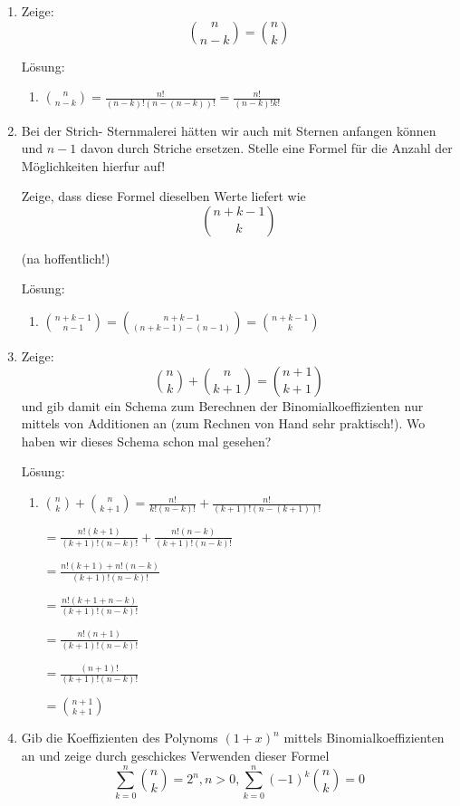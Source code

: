 \documentclass[main.tex]{subfiles}
\begin{document}
\begin{enumerate}
	\item Zeige:
	      \[ \binom{n}{n - k} = \binom{n}{k} \]

	      Lösung:
	      \begin{enumerate}
		      \item \( \binom{n}{n-k}
		            = \frac{n!}{(n-k)! (n - (n -k))!}
		            = \frac{n!}{(n - k)! k!} \)
	      \end{enumerate}
	\item Bei der Strich- Sternmalerei hätten wir auch mit Sternen anfangen können
	      und \( n - 1 \) davon durch Striche ersetzen. Stelle eine Formel für die Anzahl der Möglichkeiten hierfur auf!

	      Zeige, dass diese Formel dieselben Werte liefert wie
	      \[ \binom{ n + k - 1}{ k} \]

	      (na hoffentlich!)

	      Lösung:
	      \begin{enumerate}
		      \item \( \binom{n + k -1}{n-1}
		            = \binom{n + k -1}{(n + k - 1)- (n-1)}
		            = \binom{n + k -1}{k}\)
	      \end{enumerate}
	\item Zeige:
	      \[ \binom{n}{k} + \binom{n}{ k + 1} = \binom{n + 1}{k + 1} \]
	      und gib damit ein Schema zum Berechnen der Binomialkoeffizienten nur
	      mittels von Additionen an (zum Rechnen von Hand sehr praktisch!). Wo
	      haben wir dieses Schema schon mal gesehen?

	      Lösung:
	      \begin{enumerate}
		      \item \( \binom{n}{k} + \binom{n}{k + 1}
		            = \frac{n!}{k! (n-k)!} + \frac{n!}{(k+1)! (n - (k +1))!} \)

		            \( =  \frac{n!(k+1)}{(k+1)! (n-k)!} + \frac{n! (n - k)}{(k+1)! (n - k)!} \)

		            \( =  \frac{n!(k+1) + n!(n-k)}{(k+1)! (n - k)!} \)

		            \( =  \frac{n!(k+1 + n-k)}{(k+1)! (n - k)!} \)

		            \( =  \frac{n!(n + 1)}{(k+1)! (n - k)!} \)

		            \( =  \frac{(n + 1)!}{(k+1)! (n - k)!} \)

		            \( = \binom{n+1}{k+1} \)
	      \end{enumerate}
	\item  Gib die Koeffizienten des Polynoms \( (1 + x)^n \) mittels Binomialkoeffizienten
	      an und zeige durch geschickes Verwenden dieser Formel
	      \[ \sum_{ k= 0}^{n} \binom{n}{k} = 2^n, n > 0, \sum_{k = 0}^{n} (-1)^k \binom{n}{k} = 0 \]


\end{enumerate}
\end{document}
